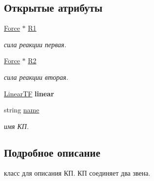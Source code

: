 \subsection*{Открытые атрибуты}
\begin{DoxyCompactItemize}
\item 
\hypertarget{class_k_pair_a61ee535f425051e90f4cac43b168a5b9}{
\hyperlink{class_force}{Force} $\ast$ \hyperlink{class_k_pair_a61ee535f425051e90f4cac43b168a5b9}{R1}}
\label{class_k_pair_a61ee535f425051e90f4cac43b168a5b9}

\begin{DoxyCompactList}\small\item\em сила реакции первая. \item\end{DoxyCompactList}\item 
\hypertarget{class_k_pair_a2d46bf51f1ecb50174b67009bed8c1a5}{
\hyperlink{class_force}{Force} $\ast$ \hyperlink{class_k_pair_a2d46bf51f1ecb50174b67009bed8c1a5}{R2}}
\label{class_k_pair_a2d46bf51f1ecb50174b67009bed8c1a5}

\begin{DoxyCompactList}\small\item\em сила реакции вторая. \item\end{DoxyCompactList}\item 
\hypertarget{class_k_pair_ab2a27405a3147fae38584079c060d129}{
\hyperlink{struct_linear_t_f}{LinearTF} {\bfseries linear}}
\label{class_k_pair_ab2a27405a3147fae38584079c060d129}

\item 
\hypertarget{class_k_pair_ae2868cc85dce1139586a5a60eab22400}{
string \hyperlink{class_k_pair_ae2868cc85dce1139586a5a60eab22400}{name}}
\label{class_k_pair_ae2868cc85dce1139586a5a60eab22400}

\begin{DoxyCompactList}\small\item\em имя КП. \item\end{DoxyCompactList}\end{DoxyCompactItemize}


\subsection{Подробное описание}
класс для описания КП. КП соединяет два звена. 

